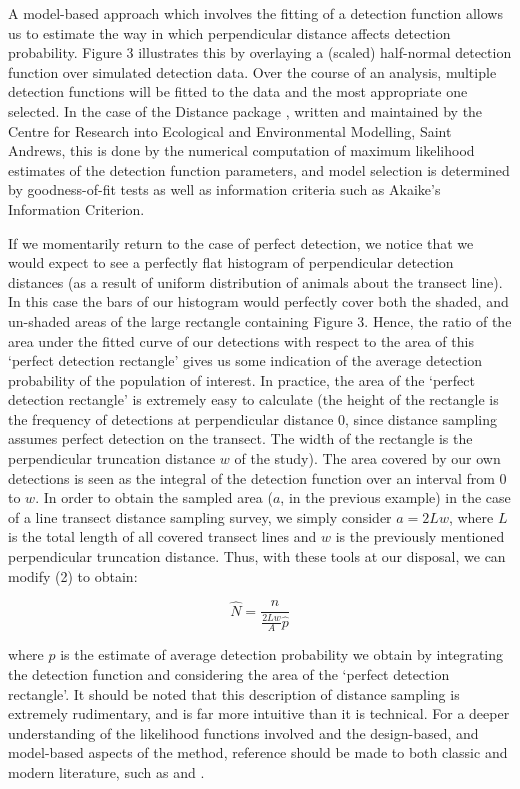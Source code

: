 \documentclass[11pt]{article}
\begin{document}
\begin{multicols}{2}
A model-based approach which involves the fitting of a detection function allows us to estimate the way in which perpendicular distance affects detection probability. Figure 3 illustrates this by overlaying a (scaled) half-normal detection function over simulated detection data. Over the course of an analysis, multiple detection functions will be fitted to the data and the most appropriate one selected. In the case of the Distance package \cite{distance}, written and maintained by the Centre for Research into Ecological and Environmental Modelling, Saint Andrews, this is done by the numerical computation of maximum likelihood estimates of the detection function parameters, and model selection is determined by goodness-of-fit tests as well as information criteria such as Akaike's Information Criterion.


If we momentarily return to the case of perfect detection, we notice that we would expect to see a perfectly flat histogram of perpendicular detection distances (as a result of uniform distribution of animals about the transect line). In this case the bars of our histogram would perfectly cover both the shaded, and un-shaded areas of the large rectangle containing Figure 3. Hence, the ratio of the area under the fitted curve of our detections with respect to the area of this `perfect detection rectangle' gives us some indication of the average detection probability of the population of interest. In practice, the area of the `perfect detection rectangle' is extremely easy to calculate (the height of the rectangle is the frequency of detections at perpendicular distance 0, since distance sampling assumes perfect detection on the transect. The width of the rectangle is the perpendicular truncation distance $w$ of the study). The area covered by our own detections is seen as the integral of the detection function over an interval from $0$ to $w$. In order to obtain the sampled area ($a$, in the previous example) in the case of a line transect distance sampling survey, we simply consider $a=2Lw$, where $L$ is the total length of all covered transect lines and $w$ is the previously mentioned perpendicular truncation distance. Thus, with these tools at our disposal, we can modify (2) to obtain:

\begin{equation}
\hat{N}=\frac{n}{\frac{2Lw}{A}\hat{p}}
\end{equation}


where $\hat{p}$ is the estimate of average detection probability we obtain by integrating the detection function and considering the area of the `perfect detection rectangle'. It should be noted that this description of distance sampling is extremely rudimentary, and is far more intuitive than it is technical. For a deeper understanding of the likelihood functions involved and the design-based, and model-based aspects of the method, reference should be made to both classic and modern literature, such as \cite{EAB} and \cite{DS2015}.


\end{multicols}
\end{document}
